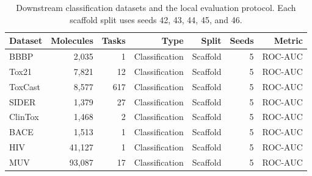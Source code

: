 \begin{table}[t]
\centering
\caption{Downstream classification datasets and the local evaluation protocol. Each scaffold split uses seeds 42, 43, 44, 45, and 46.}
\label{tab:datasets}
\begin{tabular}{lrrrrrr}
\toprule
Dataset & Molecules & Tasks & Type & Split & Seeds & Metric \\
\midrule
BBBP & 2,035 & 1 & Classification & Scaffold & 5 & ROC-AUC \\
Tox21 & 7,821 & 12 & Classification & Scaffold & 5 & ROC-AUC \\
ToxCast & 8,577 & 617 & Classification & Scaffold & 5 & ROC-AUC \\
SIDER & 1,379 & 27 & Classification & Scaffold & 5 & ROC-AUC \\
ClinTox & 1,468 & 2 & Classification & Scaffold & 5 & ROC-AUC \\
BACE & 1,513 & 1 & Classification & Scaffold & 5 & ROC-AUC \\
HIV & 41,127 & 1 & Classification & Scaffold & 5 & ROC-AUC \\
MUV & 93,087 & 17 & Classification & Scaffold & 5 & ROC-AUC \\
\bottomrule
\end{tabular}
\end{table}
